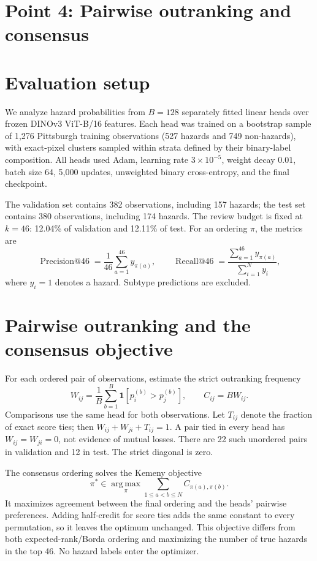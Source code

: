 \documentclass[10pt,a4paper]{article}
\newcommand{\ind}{\mathbf{1}}
\begin{document}
\section*{Point 4: Pairwise outranking and consensus}
\section{Evaluation setup}
We analyze hazard probabilities from $B=128$ separately fitted linear heads over
frozen DINOv3 ViT-B/16 features. Each head was trained on a bootstrap sample of
1,276 Pittsburgh training observations (527 hazards and 749 non-hazards), with
exact-pixel clusters sampled within strata defined by their binary-label composition.
All heads used Adam, learning rate $3\times10^{-5}$, weight decay $0.01$, batch
size 64, 5,000 updates, unweighted binary cross-entropy, and the final checkpoint.

The validation set contains 382 observations, including 157 hazards; the test set
contains 380 observations, including 174 hazards. The review budget is fixed at
$k=46$: 12.04\% of validation and 12.11\% of test. For an ordering $\pi$, the metrics are
\begin{equation}
\operatorname{Precision@46}=\frac{1}{46}\sum_{a=1}^{46}y_{\pi(a)},
\qquad
\operatorname{Recall@46}=\frac{\sum_{a=1}^{46}y_{\pi(a)}}{\sum_{i=1}^{N}y_i},
\end{equation}
where $y_i=1$ denotes a hazard. Subtype predictions are excluded.

\section{Pairwise outranking and the consensus objective}
For each ordered pair of observations, estimate the strict outranking frequency
\begin{equation}
W_{ij}=\frac{1}{B}\sum_{b=1}^{B}\ind\!\left[p_i^{(b)}>p_j^{(b)}\right],
\qquad C_{ij}=B W_{ij}.
\end{equation}
Comparisons use the same head for both observations. Let $T_{ij}$ denote the
fraction of exact score ties; then $W_{ij}+W_{ji}+T_{ij}=1$. A pair tied in every
head has $W_{ij}=W_{ji}=0$, not evidence of mutual losses. There are 22 such
unordered pairs in validation and 12 in test. The strict diagonal is zero.

The consensus ordering solves the Kemeny objective
\begin{equation}
\pi^*\in\operatorname*{arg\,max}_{\pi}
\sum_{1\leq a<b\leq N}C_{\pi(a),\pi(b)}.
\label{eq:kemeny}
\end{equation}
It maximizes agreement between the final ordering and the heads' pairwise
preferences. Adding half-credit for score ties adds the same constant to every
permutation, so it leaves the optimum unchanged. This objective differs from
both expected-rank/Borda ordering and maximizing the number of true hazards in
the top 46. No hazard labels enter the optimizer.
\end{document}
